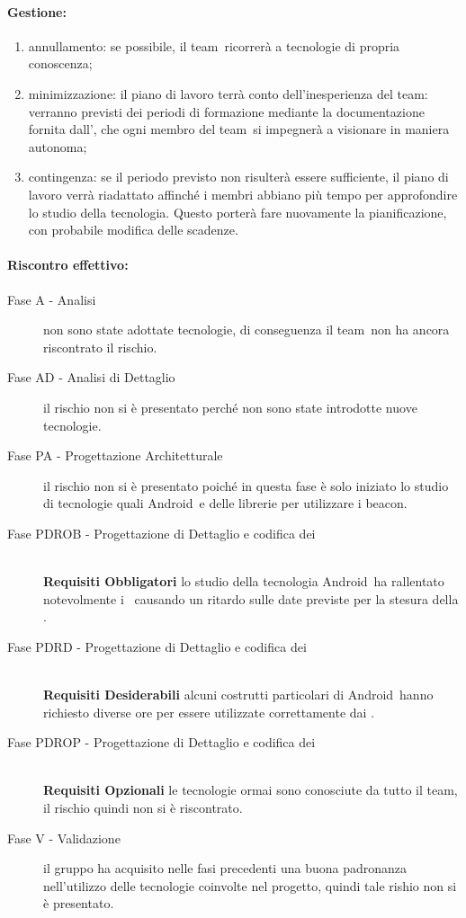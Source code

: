 \documentclass[../PianoProgetto.tex]{subfiles}
\begin{document}
	\paragraph*{Gestione:}
	\begin{enumerate}
		\item annullamento: se possibile, il team\g\ ricorrerà a tecnologie di propria conoscenza;
		\item minimizzazione: il piano di lavoro terrà conto dell'inesperienza del team\g : verranno previsti dei periodi di formazione mediante la documentazione fornita dall'\amministratore , che ogni membro del team\g\ si impegnerà a visionare in maniera autonoma;
		\item contingenza: se il periodo previsto non risulterà essere sufficiente, il piano di lavoro verrà riadattato affinché i membri abbiano più tempo per approfondire lo studio della tecnologia. Questo porterà fare nuovamente la pianificazione, con probabile modifica delle scadenze.
	\end{enumerate}
	
	
	\paragraph*{Riscontro effettivo:} 
		\begin{description}
			\item[Fase A - Analisi] non sono state adottate tecnologie, di conseguenza il team\g\ non ha ancora riscontrato il rischio.
			\item[Fase AD - Analisi di Dettaglio] il rischio non si è presentato perché non sono state introdotte nuove tecnologie.
			\item[Fase PA - Progettazione Architetturale] il rischio non si è presentato poiché in questa fase è solo iniziato lo studio di tecnologie quali Android\g\ e delle librerie per utilizzare i beacon\g.
			\item[Fase PDROB - Progettazione di Dettaglio e codifica dei]  \ \\
					 \textbf{Requisiti Obbligatori} lo studio della tecnologia Android\g\ ha rallentato notevolmente i \progettisti\, causando un ritardo sulle date previste per la stesura della .
			\item[Fase PDRD - Progettazione di Dettaglio e codifica dei] \ \\
					\textbf{Requisiti Desiderabili} alcuni costrutti particolari di Android\g\ hanno richiesto diverse ore per essere utilizzate correttamente dai \programmatori.
			\item[Fase PDROP - Progettazione di Dettaglio e codifica dei]  \ \\
					\textbf{Requisiti Opzionali} le tecnologie ormai sono conosciute da tutto il team, il rischio quindi non si è riscontrato.
			\item[Fase V - Validazione] il gruppo ha acquisito nelle fasi precedenti una buona padronanza nell'utilizzo delle tecnologie coinvolte nel progetto, quindi tale rishio non si è presentato.
		\end{description}
\end{document}
